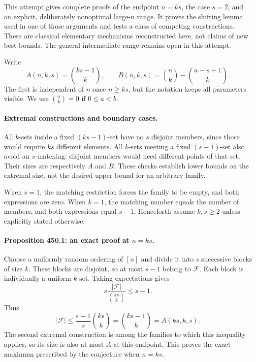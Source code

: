 \documentclass[11pt]{article}
\begin{document}
This attempt gives complete proofs of the endpoint $n=ks$, the case $s=2$, and an explicit, deliberately nonoptimal large-$n$ range. It proves the shifting lemma used in one of those arguments and tests a class of competing constructions. These are classical elementary mechanisms reconstructed here, not claims of new best bounds. The general intermediate range remains open in this attempt.

Write
\[
 A(n,k,s)=\binom{ks-1}{k},\qquad
 B(n,k,s)=\binom nk-\binom{n-s+1}{k}.
\]
The first is independent of $n$ once $n\geq ks$, but the notation keeps all parameters visible. We use $\binom ab=0$ if $0\leq a<b$.

\paragraph{Extremal constructions and boundary cases.}
All $k$-sets inside a fixed $(ks-1)$-set have no $s$ disjoint members, since those would require $ks$ different elements. All $k$-sets meeting a fixed $(s-1)$-set also avoid an $s$-matching: disjoint members would need different points of that set. Their sizes are respectively $A$ and $B$. These checks establish lower bounds on the extremal size, not the desired upper bound for an arbitrary family.

When $s=1$, the matching restriction forces the family to be empty, and both expressions are zero. When $k=1$, the matching number equals the number of members, and both expressions equal $s-1$. Henceforth assume $k,s\geq2$ unless explicitly stated otherwise.

\paragraph{Proposition 450.1: an exact proof at $n=ks$.}
Choose a uniformly random ordering of $[n]$ and divide it into $s$ successive blocks of size $k$. These blocks are disjoint, so at most $s-1$ belong to $\mathcal F$. Each block is individually a uniform $k$-set. Taking expectations gives
\[
                     s\frac{|\mathcal F|}{\binom{ks}{k}}\leq s-1.
\]
Thus
\begin{equation}\label{a450:endpoint}
 |\mathcal F|\leq\frac{s-1}{s}\binom{ks}{k}
                    =\binom{ks-1}{k}=A(ks,k,s).
\end{equation}
The second extremal construction is among the families to which this inequality applies, so its size is also at most $A$ at this endpoint. This proves the exact maximum prescribed by the conjecture when $n=ks$.
\end{document}
